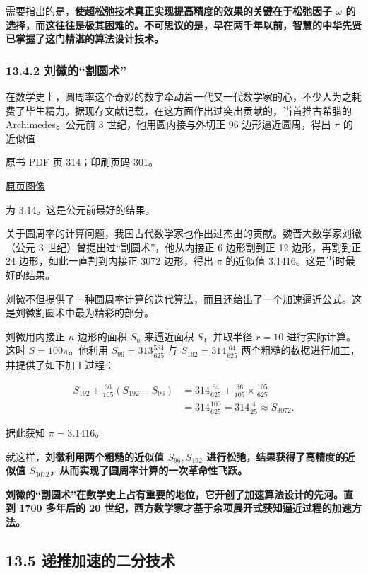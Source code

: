 需要指出的是，\textbf{使超松弛技术真正实现提高精度的效果的关键在于松弛因子 \(\omega\) 的选择，而这往往是极其困难的。不可思议的是，早在两千年以前，智慧的中华先贤已掌握了这门精湛的算法设计技术。}

\subsubsection{13.4.2 刘徽的``割圆术''}\label{ch13-ux5218ux5fbdux7684ux5272ux5706ux672f}

在数学史上，圆周率这个奇妙的数字牵动着一代又一代数学家的心，不少人为之耗费了毕生精力。据现存文献记载，在这方面作出过突出贡献的，当首推古希腊的 Archimedes。公元前 3 世纪，他用圆内接与外切正 96 边形逼近圆周，得出 \(\pi\) 的近似值

\clearpage

原书 PDF 页 314；印刷页码 301。

\href{source-images/pdf-314.jpeg}{原页图像}

为 3.14。这是公元前最好的结果。

关于圆周率的计算问题，我国古代数学家也作出过杰出的贡献。魏晋大数学家刘徽（公元 3 世纪）曾提出过``割圆术''，他从内接正 6 边形割到正 12 边形，再割到正 24 边形，如此一直割到内接正 3072 边形，得出 \(\pi\) 的近似值 3.1416。这是当时最好的结果。

刘徽不但提供了一种圆周率计算的迭代算法，而且还给出了一个加速逼近公式。这是刘徽割圆术中最为精彩的部分。

刘徽用内接正 \(n\) 边形的面积 \(S_n\) 来逼近面积 \(S\)，并取半径 \(r=10\) 进行实际计算。这时 \(S=100\pi\)。他利用 \(S_{96}=313\frac{584}{625}\) 与 \(S_{192}=314\frac{64}{625}\) 两个粗糙的数据进行加工，并提供了如下加工过程：

\[
\begin{aligned}
S_{192}+\frac{36}{105}(S_{192}-S_{96})
&=314\frac{64}{625}+\frac{36}{105}\times\frac{105}{625}\\
&=314\frac{100}{625}=314\frac{4}{25}\approx S_{3072}.
\end{aligned}
\]

据此获知 \(\pi=3.1416\)。

就这样，\textbf{刘徽利用两个粗糙的近似值 \(S_{96},S_{192}\) 进行松弛，结果获得了高精度的近似值 \(S_{3072}\)，从而实现了圆周率计算的一次革命性飞跃。}

\textbf{刘徽的``割圆术''在数学史上占有重要的地位，它开创了加速算法设计的先河。直到 1700 多年后的 20 世纪，西方数学家才基于余项展开式获知逼近过程的加速方法。}

\subsection{13.5 递推加速的二分技术}\label{ch13-ux9012ux63a8ux52a0ux901fux7684ux4e8cux5206ux6280ux672f}

